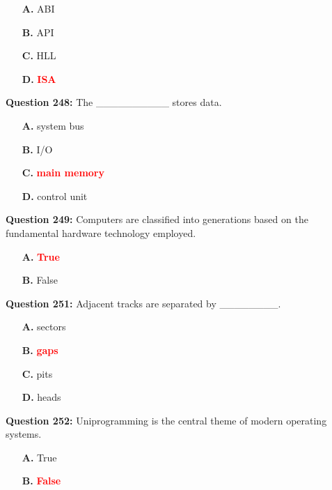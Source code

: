 \documentclass[12pt,a4paper]{article}
\begin{document}
\begin{itemize}
    \item[\textbf{A.}] ABI
    \item[\textbf{B.}] API
    \item[\textbf{C.}] HLL
    \item[\textbf{D.}] \textcolor{red}{\textbf{ISA}}
\end{itemize}

\vspace{0.5cm}

\textbf{Question 248:} The __________ stores data.

\begin{itemize}
    \item[\textbf{A.}] system bus
    \item[\textbf{B.}] I/O
    \item[\textbf{C.}] \textcolor{red}{\textbf{main memory}}
    \item[\textbf{D.}] control unit
\end{itemize}

\vspace{0.5cm}

\textbf{Question 249:} Computers are classified into generations based on the fundamental hardware technology employed.

\begin{itemize}
    \item[\textbf{A.}] \textcolor{red}{\textbf{True}}
    \item[\textbf{B.}] False
\end{itemize}

\vspace{0.5cm}

\textbf{Question 251:} Adjacent tracks are separated by ________.

\begin{itemize}
    \item[\textbf{A.}] sectors
    \item[\textbf{B.}] \textcolor{red}{\textbf{gaps}}
    \item[\textbf{C.}] pits
    \item[\textbf{D.}] heads
\end{itemize}

\vspace{0.5cm}

\textbf{Question 252:} Uniprogramming is the central theme of modern operating systems.

\begin{itemize}
    \item[\textbf{A.}] True
    \item[\textbf{B.}] \textcolor{red}{\textbf{False}}
\end{itemize}
\end{document}
